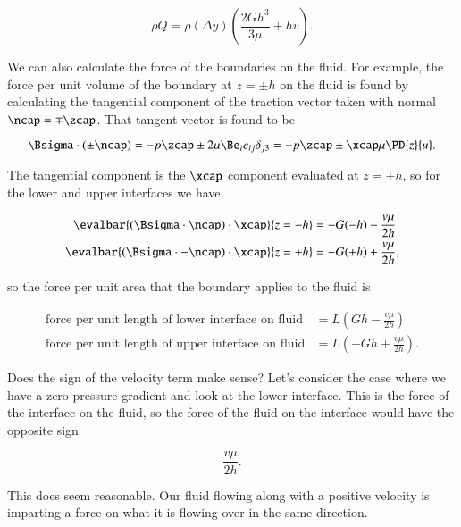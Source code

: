 {\begin{equation}\label{eqn:continuumFluidsReview:1370}
\rho Q =
\rho (\Delta y) \left( 
\frac{2 G h^3}{3 \mu} + h v
\right).
\end{equation}

We can also calculate the force of the boundaries on the fluid.  For example, the force per unit volume of the boundary at $z = \pm h$ on the fluid is found by calculating the tangential component of the traction vector taken with normal $\ncap = \mp \zcap$.  That tangent vector is found to be

\begin{equation}\label{eqn:continuumFluidsReview:1390}
\Bsigma \cdot (\pm \ncap) = -p \zcap \pm 2 \mu \Be_i e_{ij} \delta_{j 3} = - p \zcap \pm \xcap \mu \PD{z}{u}.
\end{equation}

The tangential component is the $\xcap$ component evaluated at $z = \pm h$, so for the lower and upper interfaces we have

\begin{align}\label{eqn:continuumFluidsReview:1410}
\evalbar{(\Bsigma \cdot \ncap) \cdot \xcap}{z = -h} &= -G (-h) - \frac{v \mu}{2 h} \\
\evalbar{(\Bsigma \cdot -\ncap) \cdot \xcap}{z = +h} &= -G (+h) + \frac{v \mu}{2 h},
\end{align}

so the force per unit area that the boundary applies to the fluid is

\begin{align}\label{eqn:continuumFluidsReview:1430}
\text{force per unit length of lower interface on fluid} &= L \left( G h - \frac{v \mu}{2 h} \right) \\
\text{force per unit length of upper interface on fluid} 
&= L \left( -G h + \frac{v \mu}{2 h} \right).
\end{align}

Does the sign of the velocity term make sense?  Let's consider the case where we have a zero pressure gradient and look at the lower interface.  This is the force of the interface on the fluid, so the force of the fluid on the interface would have the opposite sign

\begin{equation}\label{eqn:continuumFluidsReview:1470}
\frac{v \mu}{2 h}.
\end{equation}

This does seem reasonable.  Our fluid flowing along with a positive velocity is imparting a force on what it is flowing over in the same direction.
} %

